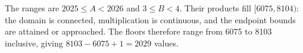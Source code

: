 The ranges are $2025\le A<2026$ and $3\le B<4$. Their products fill $[6075,8104)$: the domain is connected, multiplication is continuous, and the endpoint bounds are attained or approached. The floors therefore range from 6075 to 8103 inclusive, giving $8103-6075+1=\boxed{2029}$ values.
